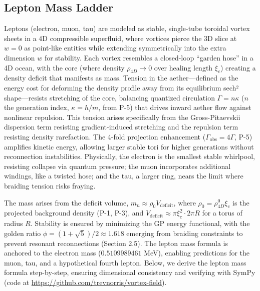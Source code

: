 \subsection{Lepton Mass Ladder}
\label{sec:leptons}

Leptons (electron, muon, tau) are modeled as stable, single-tube toroidal vortex sheets in a 4D compressible superfluid, where vortices pierce the 3D slice at $w=0$ as point-like entities while extending symmetrically into the extra dimension $w$ for stability. Each vortex resembles a closed-loop ``garden hose'' in a 4D ocean, with the core (where density $\rho_{4D} \to 0$ over healing length $\xi_c$) creating a density deficit that manifests as mass. Tension in the aether—defined as the energy cost for deforming the density profile away from its equilibrium sech² shape—resists stretching of the core, balancing quantized circulation $\Gamma = n \kappa$ ($n$ the generation index, $\kappa = h / m$, from P-5) that drives inward aether flow against nonlinear repulsion. This tension arises specifically from the Gross-Pitaevskii dispersion term resisting gradient-induced stretching and the repulsion term resisting density rarefaction. The 4-fold projection enhancement ($\Gamma_{\text{obs}} = 4\Gamma$, P-5) amplifies kinetic energy, allowing larger stable tori for higher generations without reconnection instabilities. Physically, the electron is the smallest stable whirlpool, resisting collapse via quantum pressure; the muon incorporates additional windings, like a twisted hose; and the tau, a larger ring, nears the limit where braiding tension risks fraying.

The mass arises from the deficit volume, $m_n \approx \rho_0 V_{\text{deficit}}$, where $\rho_0 = \rho_{4D}^0 \xi_c$ is the projected background density (P-1, P-3), and $V_{\text{deficit}} \approx \pi \xi_c^2 \cdot 2\pi R$ for a torus of radius $R$. Stability is ensured by minimizing the GP energy functional, with the golden ratio $\phi = (1 + \sqrt{5})/2 \approx 1.618$ emerging from braiding constraints to prevent resonant reconnections (Section 2.5). The lepton mass formula is anchored to the electron mass ($0.5109989461$ MeV), enabling predictions for the muon, tau, and a hypothetical fourth lepton. Below, we derive the lepton mass formula step-by-step, ensuring dimensional consistency and verifying with SymPy (code at \url{https://github.com/trevnorris/vortex-field}).

